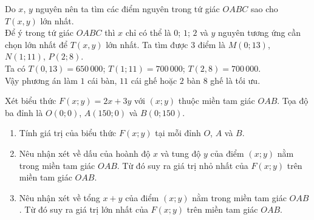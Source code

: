 \begin{bt}
{		Do $x$, $y$ nguyên nên ta tìm các điểm nguyên trong tứ giác $OABC$ sao cho $T(x, y)$ lớn nhất.\\
		Để ý trong tứ giác $OABC$ thì $x$ chỉ có thể là $0$; $1$; $2$ và $y$ nguyên tương ứng cần chọn lớn nhất để $T(x, y)$ lớn nhất. Ta tìm được 3 điểm là $M(0;13)$, $N(1;11)$, $P(2;8)$.\\
		Ta có $T(0{,}13)=650\,000 $; $ T(1 ; 11)=700\,000$; $T(2{,}8)=700\,000$.\\
		Vậy phương án làm $1$ cái bàn, $11$ cái ghế hoặc $2$ bàn $8$ ghế là tối ưu.
	}
\end{bt}

\begin{bt}%
	Xét biểu thức $F(x;y)=2x+3y$ với $(x;y)$ thuộc miền tam giác $OAB$. Tọa độ ba đỉnh là $O( 0;0)$, $A(150;0)$ và $B( 0;150)$.
	\begin{enumerate}
		\item Tính giá trị của biểu thức $F(x;y)$ tại mỗi đỉnh $O$, $A$ và $B$.
		\item Nêu nhận xét về dấu của hoành độ $x$ và tung độ $y$ của điểm $(x;y)$ nằm trong miền tam giác $OAB$. Từ đó suy ra giá trị nhỏ nhất của $F(x;y)$ trên miền tam giác $OAB$.
		\item Nêu nhận xét về tổng $x+y$ của điểm $(x;y)$ nằm trong miền tam giác $OAB$. Từ đó suy ra giá trị lớn nhất của $F(x;y)$ trên miền tam giác $OAB$.
	\end{enumerate}
\end{bt}

